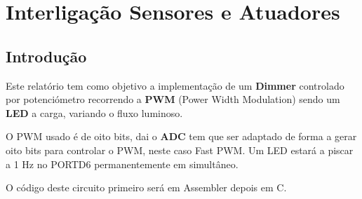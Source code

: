 \documentclass[titlepage, a4paper, 10pt, reqno, openany]{report}
\begin{document}
\renewcommand\thesection{\arabic{section}}
\renewcommand\thesubsection{\thesection.\arabic{subsection}}
\renewcommand\thesubsubsection{\thesection.\thesubsection.\arabic{subsubsection}}
\pagestyle{plain}%
	\chapter*{Interliga\c{c}\~{a}o Sensores e Atuadores}
	\section{Introdu\c{c}\~{a}o}
Este relat\'{o}rio tem como objetivo a implementa\c{c}\~{a}o de um {\bf Dimmer} controlado por potenci\'{o}metro recorrendo a {\bf PWM} (Power Width Modulation) sendo um {\bf LED} a carga, variando o fluxo luminoso. \par
O PWM usado \'{e} de oito bits, dai o {\bf ADC} tem que ser adaptado de forma a gerar oito bits para controlar o PWM, neste caso Fast PWM. Um LED estar\'{a} a piscar a 1 Hz no PORTD6 permanentemente em simult\^{a}neo. \par
O c\'{o}digo deste circuito primeiro ser\'{a} em Assembler depois em C. 
\end{document}
